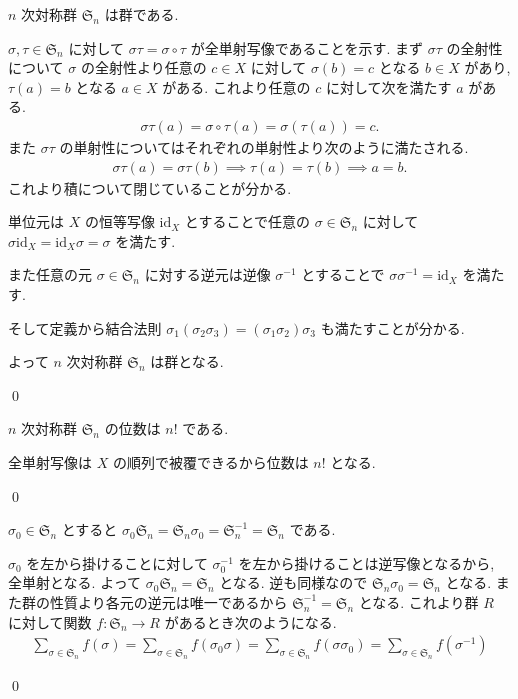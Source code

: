 \documentclass[uplatex,dvipdfmx,a4paper,11pt]{jlreq}
\makeatletter
\renewcommand{\SS}{\mathfrak{S}}
\newcommand{\id}{\mathrm{id}}
\numberwithin{equation}{section}
\theoremstyle{definition}
\renewenvironment{proof}[1][\proofname]{\par
  \normalfont
  \topsep6\p@\@plus6\p@ \trivlist
  \item[\hskip\labelsep{\bfseries #1}\@addpunct{\bfseries}]\ignorespaces\quad\par
}{
  \qed\endtrivlist\@endpefalse
}
\renewcommand\proofname{証明}
\makeatother
\begin{document}
\begin{theorem}[Q21-3(i)(ii)(iii)(iv)]
  $n$ 次対称群 $\SS_n$ は群である.
\end{theorem}
\begin{proof}
  $\sigma,\tau\in\SS_n$ に対して $\sigma\tau = \sigma\circ\tau$ が全単射写像であることを示す.
  まず $\sigma\tau$ の全射性について $\sigma$ の全射性より任意の $c\in X$ に対して $\sigma(b) = c$ となる $b\in X$ があり, $\tau(a) = b$ となる $a\in X$ がある.
  これより任意の $c$ に対して次を満たす $a$ がある.
  \begin{align}
    \sigma\tau(a) = \sigma\circ\tau(a) = \sigma(\tau(a)) = c.
  \end{align}
  また $\sigma\tau$ の単射性についてはそれぞれの単射性より次のように満たされる.
  \begin{align}
    \sigma\tau(a) = \sigma\tau(b) \implies \tau(a) = \tau(b) \implies a = b.
  \end{align}
  これより積について閉じていることが分かる.

  単位元は $X$ の恒等写像 $\id_X$ とすることで任意の $\sigma\in\SS_n$ に対して $\sigma\id_X = \id_X\sigma = \sigma$ を満たす.

  また任意の元 $\sigma\in\SS_n$ に対する逆元は逆像 $\sigma^{-1}$ とすることで $\sigma\sigma^{-1} = \id_X$ を満たす.

  そして定義から結合法則 $\sigma_1(\sigma_2\sigma_3) = (\sigma_1\sigma_2)\sigma_3$ も満たすことが分かる.

  よって $n$ 次対称群 $\SS_n$ は群となる.
\end{proof}

\begin{proposition}[Q21-4]
  $n$ 次対称群 $\SS_n$ の位数は $n!$ である.
\end{proposition}
\begin{proof}
  全単射写像は $X$ の順列で被覆できるから位数は $n!$ となる.
\end{proof}

\begin{proposition}[Q21-5(i)(ii), Q21-6(i)(ii)]
  $\sigma_0\in\SS_n$ とすると $\sigma_0\SS_n = \SS_n\sigma_0 = \SS_n^{-1} = \SS_n$ である.
\end{proposition}
\begin{proof}
  $\sigma_0$ を左から掛けることに対して $\sigma_0^{-1}$ を左から掛けることは逆写像となるから, 全単射となる. よって $\sigma_0\SS_n = \SS_n$ となる. 逆も同様なので $\SS_n\sigma_0 = \SS_n$ となる.
  また群の性質より各元の逆元は唯一であるから $\SS_n^{-1} = \SS_n$ となる.
  これより群 $R$ に対して関数 $f:\SS_n\to R$ があるとき次のようになる.
  \begin{align}
    \sum_{\sigma\in\SS_n}f(\sigma) = \sum_{\sigma\in\SS_n}f(\sigma_0\sigma) = \sum_{\sigma\in\SS_n}f(\sigma\sigma_0) = \sum_{\sigma\in\SS_n}f(\sigma^{-1})
  \end{align}
\end{proof}
\end{document}
